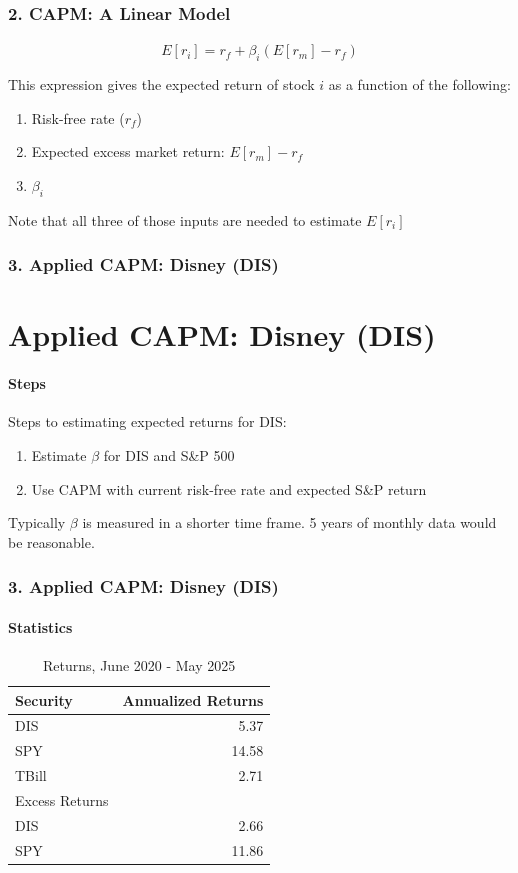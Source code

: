 \documentclass{beamer}
\begin{document}
\begin{frame}[t]
    \frametitle{2. CAPM: A Linear Model}
    \framesubtitle{}


    $$\boxed{E[r_i] = r_f + \beta_i(E[r_m] - r_f)}$$
    \vspace{1em}

    This expression gives the expected return of stock $i$ as a function of the following:\\
    \begin{enumerate}
        \item Risk-free rate ($r_f$)
        \item Expected excess market return: $E[r_m] - r_f$
        \item $\beta_i$
    \end{enumerate}
    \vspace{1em}
    Note that all three of those inputs are needed to estimate $E[r_i]$

\end{frame}

\begin{frame}[t]
    \frametitle{3. Applied CAPM: Disney (DIS)}
    \section{Applied CAPM: Disney (DIS)}
    \framesubtitle{Steps}

    Steps to estimating expected returns for DIS:
    \begin{enumerate}
        \item Estimate $\beta$ for DIS and S\&P 500
        \item Use CAPM with current risk-free rate and expected S\&P return
    \end{enumerate}
    \vspace{1em}
    Typically $\beta$ is measured in a shorter time frame.   5 years of monthly data would be reasonable.

\end{frame}

\begin{frame}[t]
    \frametitle{3. Applied CAPM: Disney (DIS)}
    \framesubtitle{Statistics}

    \begin{table}
    \caption{Returns, June 2020 - May 2025}
    \begin{tabular}{lr}
    \toprule
    Security & Annualized Returns \\
    \midrule
    DIS & 5.37 \\
    SPY & 14.58 \\
    TBill & 2.71 \\
    \midrule
    Excess Returns & \\
    DIS & 2.66 \\
    SPY & 11.86 \\
    \bottomrule
    \end{tabular}
    \end{table}

\end{frame}
\end{document}
